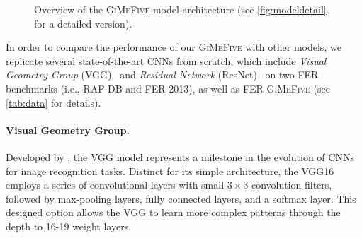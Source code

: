 \begin{figure}[ht]
  \centering
  \caption{Overview of the \textsc{GiMeFive} model architecture 
  (see \cref{fig:modeldetail} for a detailed version).} 
  \label{fig:model}
\end{figure}

In order to compare the performance of our \textsc{GiMeFive} with other models, 
we replicate several state-of-the-art CNNs from scratch, 
which include \textit{Visual Geometry Group} (VGG)~\cite{SimonyanZ14a} and 
\textit{Residual Network} (ResNet)~\cite{HeZRS16} on two FER benchmarks (i.e., RAF-DB and FER 2013), 
as well as FER \textsc{GiMeFive} (see \cref{tab:data} for details). 

\paragraph{Visual Geometry Group.}
Developed by \citet{SimonyanZ14a}, 
the VGG model represents a milestone in the evolution of CNNs for image recognition tasks. 
Distinct for its simple architecture, 
the VGG16 employs a series of convolutional layers with small $3 \times 3$ convolution filters, 
followed by max-pooling layers, fully connected layers, and a softmax layer. 
This designed option allows the VGG to learn more complex patterns through the depth to 16-19 weight layers. 


